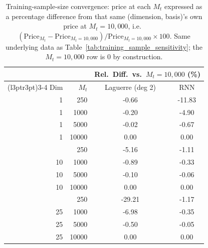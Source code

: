 \begin{table}

\caption{\label{tab:training_sample_sensitivity_relative}Training-sample-size convergence: price at each $M_t$ expressed as a percentage difference from that same (dimension, basis)'s own price at $M_t=10{,}000$, i.e.\ $(\text{Price}_{M_t} - \text{Price}_{M_t=10{,}000})/\text{Price}_{M_t=10{,}000} \times 100$. Same underlying data as Table~\ref{tab:training_sample_sensitivity}; the $M_t=10{,}000$ row is $0$ by construction.}
\footnotesize
\setlength{\tabcolsep}{4pt}
\centering
\begin{tabular}[t]{rrcc}
\toprule
\multicolumn{2}{c}{ } & \multicolumn{2}{c}{Rel.\ Diff.\ vs.\ $M_t=10{,}000$ (\%)} \\
\cmidrule(l{3pt}r{3pt}){3-4}
Dim & $M_t$ & Laguerre (deg 2) & RNN\\
\midrule
1 & 250 & -0.66 & -11.83\\
1 & 1000 & -0.20 & -4.90\\
1 & 5000 & -0.02 & -0.67\\
1 & 10000 & 0.00 & 0.00\\
\addlinespace
10 & 250 & -5.16 & -1.11\\
10 & 1000 & -0.89 & -0.33\\
10 & 5000 & -0.10 & -0.06\\
10 & 10000 & 0.00 & 0.00\\
\addlinespace
25 & 250 & -29.21 & -1.17\\
25 & 1000 & -6.98 & -0.35\\
25 & 5000 & -0.50 & -0.05\\
25 & 10000 & 0.00 & 0.00\\
\bottomrule
\end{tabular}
\end{table}
